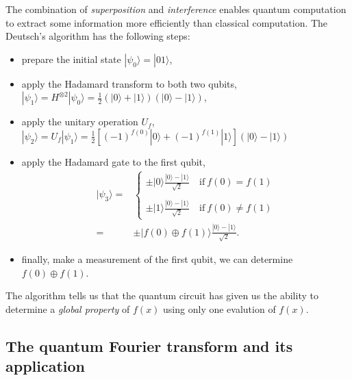 \documentclass{article}
\newcommand{\ket}[1]{| #1 \rangle}  %
\begin{document}
The combination of \textit{superposition} and \textit{interference} enables quantum computation to extract some information more efficiently than classical computation.  
The Deutsch's algorithm has the following steps:
\begin{itemize}
	\item prepare the initial state $\ket{\psi_0}=\ket{01}$, 
	
	\item apply the Hadamard transform to both two qubits, $\ket{\psi_1}= H^{\otimes 2}\ket{\psi_0}= \frac{1}{2} (\ket{0}+\ket{1})(\ket{0}-\ket{1})$,
	
	\item apply the unitary operation $U_f$, $\ket{\psi_2}=U_f \ket{\psi_1}= \frac{1}{2} [(-1)^{f(0)}\ket{0}+(-1)^{f(1)}\ket{1}] (\ket{0}-\ket{1})$
	
	\item apply the Hadamard gate to the first qubit,
	\begin{align}
		\ket{\psi_3} =& \left\{ 
		\begin{array}{ccc}
			\pm \ket{0} \frac{\ket{0}-\ket{1}}{\sqrt{2}} \quad \text{if}~ f(0)=f(1) \\
															\\
			\pm \ket{1} \frac{\ket{0}-\ket{1}}{\sqrt{2}} \quad \text{if}~ f(0)\ne f(1)
		\end{array} \right.  \\
		=& \pm \ket{f(0)\oplus f(1)} \frac{\ket{0}-\ket{1}}{\sqrt{2}}.
	\end{align} 

	\item finally, make a measurement of the first qubit, we can determine $f(0)\oplus f(1)$.
\end{itemize}
The algorithm tells us that the quantum circuit has given us the ability to determine a \textit{global property} of $f(x)$ using only one evalution of $f(x)$.




\subsection{The quantum Fourier transform and its application}
\end{document}
